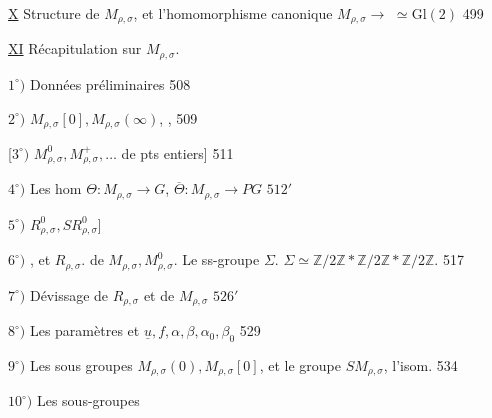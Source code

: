 \uline{X} Structure de \(M_{\rho,\sigma}\), et l'homomorphisme canonique
\(M_{\rho,\sigma}\longrightarrow\) \(\simeq\mathrm{Gl}(2)\) \hfill 499

\uline{XI} Récapitulation sur \(M_{\rho,\sigma}\).
\hfill {}


\(1^{\circ})\) Données préliminaires \hfill 508

\(2^{\circ})\) 
\(M_{\rho,\sigma}[0],M_{\rho,\sigma}(\infty)\),
,
\hfill {} 509

[\(3^{\circ})\) \(M_{\rho,\sigma}^{0},M_{\rho,\sigma}^{+},\ldots\)
 de pts entiers] \hfill 511

\(4^{\circ})\) Les hom \(\Theta:M_{\rho,\sigma}\longrightarrow G\),
\(\overline\Theta:M_{\rho,\sigma}\longrightarrow PG\) \hfill \(512'\)

\(5^{\circ})\) \(R_{\rho,\sigma}^{0},SR_{\rho,\sigma}^{0}\)] \hfill {}

\uline{\(6^{\circ})\)} ,  et \(R_{\rho,\sigma}\).
 de \(M_{\rho,\sigma},M_{\rho,\sigma}^{0}\).
Le ss-groupe \(\Sigma\).
\(\Sigma\simeq\mathbb Z/2\mathbb Z*\mathbb Z/2\mathbb Z*\mathbb Z/2\mathbb Z\).
\hfill {} 517

\uline{\(7^{\circ})\)} Dévissage de \(R_{\rho,\sigma}\) et de \(M_{\rho,\sigma}\) \hfill \(526'\)

\(8^{\circ})\) Les paramètres
 et
\(\underline u,f,\alpha,\beta,\alpha_0,\beta_0\)
 \hfill 529

\(9^{\circ})\) Les sous groupes \(M_{\rho,\sigma}(0),M_{\rho,\sigma}[0]\), et le groupe
\(SM_{\rho,\sigma}\), l'isom.  \hfill 534

\(10^{\circ})\) Les sous-groupes 
 \hfill {}

